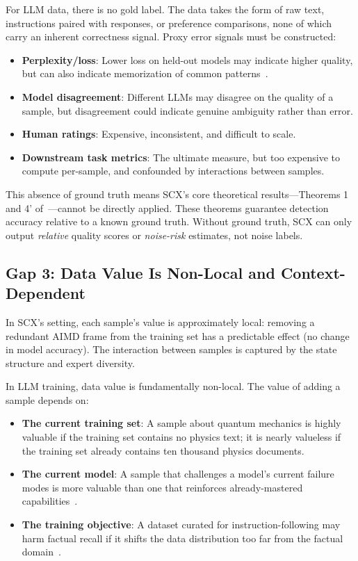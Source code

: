\documentclass[11pt,twocolumn]{article}
\begin{document}
For LLM data, there is no gold label. The data takes the form of raw text, instructions paired with responses, or preference comparisons, none of which carry an inherent correctness signal. Proxy error signals must be constructed:
\begin{itemize}
    \item \textbf{Perplexity/loss}: Lower loss on held-out models may indicate higher quality, but can also indicate memorization of common patterns~\cite{carlini2023quantifying}.
    \item \textbf{Model disagreement}: Different LLMs may disagree on the quality of a sample, but disagreement could indicate genuine ambiguity rather than error.
    \item \textbf{Human ratings}: Expensive, inconsistent, and difficult to scale.
    \item \textbf{Downstream task metrics}: The ultimate measure, but too expensive to compute per-sample, and confounded by interactions between samples.
\end{itemize}

This absence of ground truth means SCX's core theoretical results---Theorems 1 and 4' of~\cite{scx2026}---cannot be directly applied. These theorems guarantee detection accuracy relative to a known ground truth. Without ground truth, SCX can only output \textit{relative} quality scores or \textit{noise-risk} estimates, not noise labels.

\subsection{Gap 3: Data Value Is Non-Local and Context-Dependent}

In SCX's setting, each sample's value is approximately local: removing a redundant AIMD frame from the training set has a predictable effect (no change in model accuracy). The interaction between samples is captured by the state structure and expert diversity.

In LLM training, data value is fundamentally non-local. The value of adding a sample depends on:
\begin{itemize}
    \item \textbf{The current training set}: A sample about quantum mechanics is highly valuable if the training set contains no physics text; it is nearly valueless if the training set already contains ten thousand physics documents.
    \item \textbf{The current model}: A sample that challenges a model's current failure modes is more valuable than one that reinforces already-mastered capabilities~\cite{xia2024less,kaplan2024distributed}.
    \item \textbf{The training objective}: A dataset curated for instruction-following may harm factual recall if it shifts the data distribution too far from the factual domain~\cite{mukherjee2023orca}.
\end{itemize}
\end{document}
